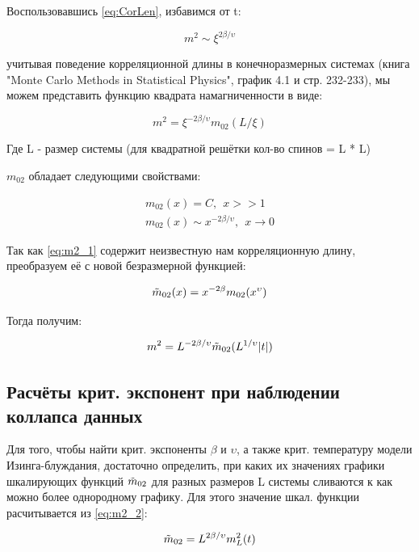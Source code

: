 Воспользовавшись \eqref{eq:CorLen}, избавимся от t:

\begin{equation}
    m^{2} \sim \xi ^{2\beta/\upsilon}
\end{equation}

учитывая поведение корреляционной длины в конечноразмерных системах (книга "Monte Carlo Methods in Statistical Physics", график 4.1 и стр. 232-233)\cite{Newmanb1999}, мы можем представить функцию квадрата намагниченности в виде:

\begin{equation}\label{eq:m2_1}
    m^{2} = \xi ^{-2\beta/\upsilon} m_{02}(L/\xi)
\end{equation}

Где L - размер системы (для квадратной решётки кол-во спинов = L * L)

$m_{02}$ обладает следующими свойствами:

\begin{align*}
    m_{02}(x) = C,\ \ x >> 1 \\
    m_{02}(x) \sim x^{-2\beta/\upsilon},\ \ x \rightarrow 0
\end{align*}

Так как \eqref{eq:m2_1} содержит неизвестную нам корреляционную длину, преобразуем её с новой безразмерной функцией:

\begin{equation}
    \Tilde{m}_{02}(x) = x^{-2\beta} m_{02}(x^{\upsilon})
\end{equation}

Тогда получим:

\begin{equation}\label{eq:m2_2}
    m^{2} = L^{-2\beta/\upsilon} \Tilde{m}_{02}(L^{1/\upsilon}|t|)
\end{equation}

\subsection{Расчёты крит. экспонент при наблюдении коллапса данных}
Для того, чтобы найти крит. экспоненты $\beta$ и $\upsilon$, а также крит. температуру модели Изинга-блуждания, достаточно определить, при каких их значениях графики шкалирующих функций $\Tilde{m}_{02}$ для разных размеров L системы сливаются к как можно более однородному графику. Для этого значение шкал. функции расчитывается из \eqref{eq:m2_2}:

\begin{equation}\label{eq:m02}
    \Tilde{m}_{02} = L^{2\beta/\upsilon} m_{L}^{2}(t)
\end{equation}

